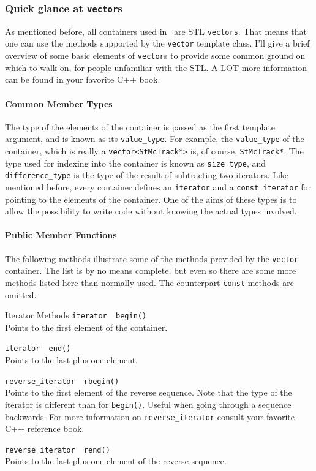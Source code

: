 \subsubsection{Quick glance at {\tt vector}s}
\label{subsec:vectors}
As mentioned before, all containers used in \StMcEvent\ are STL {\tt vectors}.  That
means that one can use the methods supported by the {\tt vector}
template class.  I'll give a brief overview of some basic elements
of {\tt vector}s to provide some common ground on which to walk on, for
people unfamiliar with the STL.  A LOT more information can be found
in your favorite C++ book.

\paragraph{Common Member Types}
The type of the elements of the container is passed as the
first template argument, and is known as its {\tt value\_type}.  For
example, the {\tt value\_type} of the  container,
which is really a \verb+vector<StMcTrack*>+ is, of course, {\tt StMcTrack*}.
The type used for indexing into the container is known as {\tt size\_type},
and {\tt difference\_type} is the type of the result of subtracting
two iterators.  Like mentioned before, every container defines an
{\tt iterator} and a {\tt const\_iterator} for pointing to the elements
of the container.  One of the aims of these types is to allow the
possibility to write code without knowing the actual types involved.

\paragraph{Public Member Functions}
The following methods illustrate some of the methods provided by
the {\tt vector} container.  The list is by no means complete, but
even so there are some more methods listed here than normally used.
The counterpart {\tt const} methods are omitted.
\begin{Entry}
\item[Iterator Methods]
  \verb+iterator  begin()+\\
  Points to the first element of the container.

  \verb+iterator  end()+\\
  Points to the last-plus-one element.

  \verb+reverse_iterator  rbegin()+\\
  Points to the first element of the reverse sequence.
  Note that the
  type of the iterator is different than for {\tt begin()}.
  Useful when going through a sequence backwards.  For more
  information on {\tt reverse\_iterator} consult your favorite
  C++ reference book.
  
  \verb+reverse_iterator  rend()+\\
  Points to the last-plus-one element of the reverse sequence.

\end{Entry}

